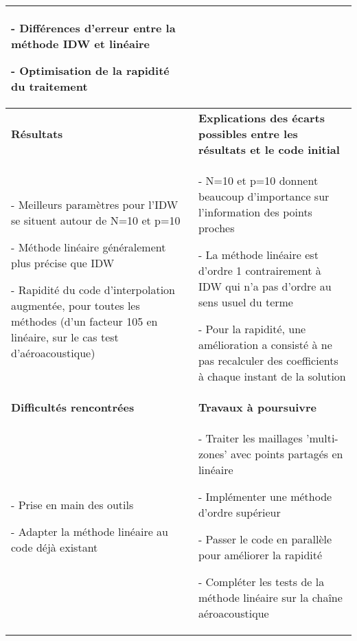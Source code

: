 \begin{table}[ht]
\begin{tabular}{|p{6.5cm}|p{8.5cm}|}
{\begin{minipage}[t]{14cm}
- Différences d'erreur entre la méthode IDW et linéaire

- Optimisation de la rapidité du traitement
\hspace{0.5cm}
\end{minipage}
} \\ 
\hline
\textbf{Résultats} & \textbf{Explications des écarts possibles entre les résultats et le code initial} \\ 
\hline
\begin{minipage}[t]{6.5cm}

- Meilleurs paramètres pour l'IDW se situent autour de N=10 et p=10

- Méthode linéaire généralement plus précise que IDW

- Rapidité du code d'interpolation augmentée, pour toutes les méthodes (d'un facteur 105 en linéaire, sur le cas test d'aéroacoustique)

\end{minipage} & 
\begin{minipage}[t]{8.5cm}

- N=10 et p=10 donnent beaucoup d'importance sur l'information des points proches

- La méthode linéaire est d'ordre 1 contrairement à IDW qui n'a pas d'ordre au sens usuel du terme

- Pour la rapidité, une amélioration a consisté à ne pas recalculer des coefficients à chaque instant de la solution

\end{minipage} \\ 
\hline
\textbf{Difficultés rencontrées} & \textbf{Travaux à poursuivre} \\ 
\hline
\begin{minipage}[t]{6.5cm}
- Prise en main des outils

- Adapter la méthode linéaire au code déjà existant
\end{minipage} & 
\begin{minipage}[t]{8.5cm}
- Traiter les maillages 'multi-zones' avec points partagés en linéaire

- Implémenter une méthode d'ordre supérieur

- Passer le code en parallèle pour améliorer la rapidité

- Compléter les tests de la méthode linéaire sur la chaîne aéroacoustique


\end{minipage} \\ 
\hline
\end{tabular}
\end{table}  
\newpage
